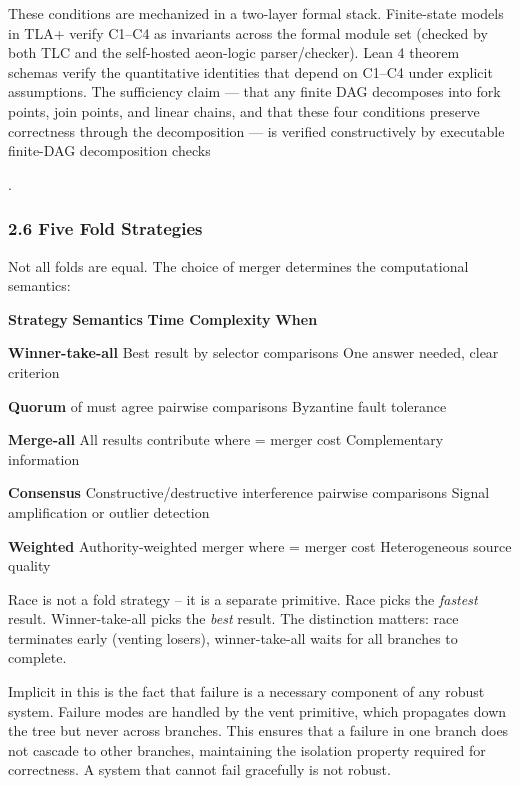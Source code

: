 \documentclass[
]{article}
\begin{document}
These conditions are mechanized in a two-layer formal stack.
Finite-state models in TLA+ verify C1--C4 as invariants across the
formal module set (checked by both TLC and the self-hosted aeon-logic
parser/checker). Lean 4 theorem schemas verify the quantitative
identities that depend on C1--C4 under explicit assumptions. The
sufficiency claim --- that any finite DAG decomposes into fork points,
join points, and linear chains, and that these four conditions preserve
correctness through the decomposition --- is verified constructively by
executable finite-DAG decomposition checks

.

\subsubsection{\texorpdfstring{\textbf{2.6 Five Fold
Strategies}}{2.6 Five Fold Strategies}}\label{five-fold-strategies}

Not all folds are equal. The choice of merger determines the
computational semantics:

\textbf{Strategy} \textbar{} \textbf{Semantics} \textbar{} \textbf{Time
Complexity} \textbar{} \textbf{When} \textbar{}

\textbf{Winner-take-all} \textbar{} Best result by selector \textbar{}
comparisons \textbar{} One answer needed, clear criterion \textbar{}

\textbf{Quorum} \textbar{} of must agree \textbar{} pairwise comparisons
\textbar{} Byzantine fault tolerance \textbar{}

\textbf{Merge-all} \textbar{} All results contribute \textbar{} where =
merger cost \textbar{} Complementary information \textbar{}

\textbf{Consensus} \textbar{} Constructive/destructive interference
\textbar{} pairwise comparisons \textbar{} Signal amplification or
outlier detection \textbar{}

\textbf{Weighted} \textbar{} Authority-weighted merger \textbar{} where
= merger cost \textbar{} Heterogeneous source quality \textbar{}

Race is not a fold strategy -- it is a separate primitive. Race picks
the \emph{fastest} result. Winner-take-all picks the \emph{best} result.
The distinction matters: race terminates early (venting losers),
winner-take-all waits for all branches to complete.

Implicit in this is the fact that failure is a necessary component of
any robust system. Failure modes are handled by the vent primitive,
which propagates down the tree but never across branches. This ensures
that a failure in one branch does not cascade to other branches,
maintaining the isolation property required for correctness. A system
that cannot fail gracefully is not robust.
\end{document}
